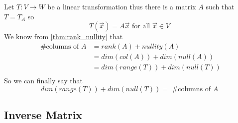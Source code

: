 \documentclass[11pt]{book}
\begin{document}
\begin{thm}\label{thm:rank_nullity_for_linear_transformations}
    Let $T : V \to W $ be a linear transformation thus there is a matrix $A$ such that $T = T_{A}$ so 
    \begin{equation*}
        T\left(\vec{x}\right) = A\vec{x} \text{ for all } \vec{x}\in V
    \end{equation*}
    We know from \cref{thm:rank_nullity} that 
    \begin{align*}
        \text{ \# columns of  }A &= rank\left(A\right) + nullity\left(A\right) \\
                                 &= dim\left(col\left(A\right)\right) + dim\left(\mathit{null} {\left( A \right)} \right)\\
                                 &= dim\left( \mathit{range} {\left( T \right)}  \right) + dim\left( \mathit{null} {\left( T \right)}  \right) \\
    \end{align*}
    So we can finally say that 
    \begin{equation*}
        dim\left( \mathit{range} {\left( T \right)}  \right) + dim\left( \mathit{null} {\left( T \right)}  \right) = \text{ \# columns of }A
    \end{equation*}
\end{thm}

\subsection{Inverse Matrix}%
\label{sub:inverse_matrix}
\end{document}
